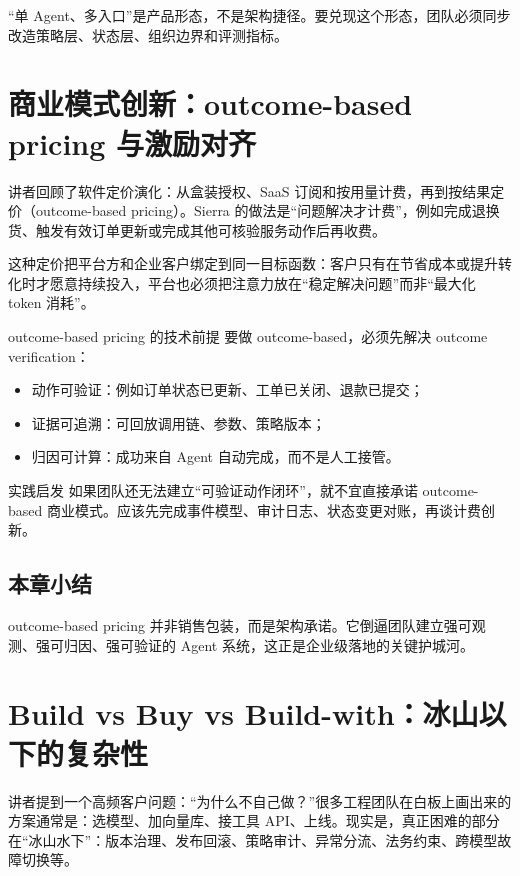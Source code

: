 \documentclass[a4paper]{article}
\begin{document}
“单 Agent、多入口”是产品形态，不是架构捷径。要兑现这个形态，团队必须同步改造策略层、状态层、组织边界和评测指标。

\section{商业模式创新：outcome-based pricing 与激励对齐}

讲者回顾了软件定价演化：从盒装授权、SaaS 订阅和按用量计费，再到按结果定价（outcome-based pricing）。Sierra 的做法是“问题解决才计费”，例如完成退换货、触发有效订单更新或完成其他可核验服务动作后再收费。

这种定价把平台方和企业客户绑定到同一目标函数：客户只有在节省成本或提升转化时才愿意持续投入，平台也必须把注意力放在“稳定解决问题”而非“最大化 token 消耗”。

\begin{knowledgebox}{outcome-based pricing 的技术前提}
要做 outcome-based，必须先解决 outcome verification：
\begin{itemize}[leftmargin=1.5em]
    \item 动作可验证：例如订单状态已更新、工单已关闭、退款已提交；
    \item 证据可追溯：可回放调用链、参数、策略版本；
    \item 归因可计算：成功来自 Agent 自动完成，而不是人工接管。
\end{itemize}
\end{knowledgebox}

\begin{importantbox}{实践启发}
如果团队还无法建立“可验证动作闭环”，就不宜直接承诺 outcome-based 商业模式。应该先完成事件模型、审计日志、状态变更对账，再谈计费创新。
\end{importantbox}

\subsection{本章小结}

outcome-based pricing 并非销售包装，而是架构承诺。它倒逼团队建立强可观测、强可归因、强可验证的 Agent 系统，这正是企业级落地的关键护城河。

\section{Build vs Buy vs Build-with：冰山以下的复杂性}

讲者提到一个高频客户问题：“为什么不自己做？”很多工程团队在白板上画出来的方案通常是：选模型、加向量库、接工具 API、上线。现实是，真正困难的部分在“冰山水下”：版本治理、发布回滚、策略审计、异常分流、法务约束、跨模型故障切换等。
\end{document}
